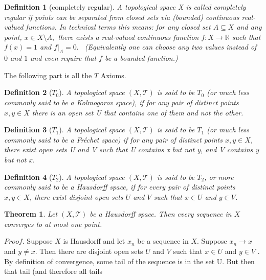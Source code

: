 \documentclass{article}
\newtheorem{definition}{Definition}[section]    %
\newtheorem{theorem}{Theorem}[section]          %
\begin{document}
\begin{definition}[completely regular]
    A topological space
    X is called completely regular if points can be
    separated from closed sets via (bounded) continuous real-valued functions. In technical terms this means: for any closed set
    ${\displaystyle A\subseteq X}$ and any point,
    ${\displaystyle x\in X\setminus A,}$ there
    exists a real-valued continuous function
    ${\displaystyle f:X\to \mathbb {R} }$ such that
    ${\displaystyle f(x)=1}$ and
    ${\displaystyle f\vert _{A}=0.}$ \
    (Equivalently one can choose any two values
    instead of
    ${\displaystyle 0}$ and
    ${\displaystyle 1}$ and even require that
    ${\displaystyle f}$ be a bounded function.)
    \cite[Tychonoff]{Tychonoff}
\end{definition}
The following part is all the $T$ Axioms.
\begin{definition}[$T_0$]
    A topological space $(X, \mathcal{T})$ is said to be $T_0$ (or much less commonly said to
    be a Kolmogorov space), if for any pair of distinct points $x, y \in X$ there is an open set U that
    contains one of them and not the other.
    \cite[script5]{MAT327topology5script}
\end{definition}
\begin{definition}[$T_1$]
    A topological space $(X, \mathcal{T})$ is said to be $T_1$ (or much less commonly said to be
    a Fr\'echet space) if for any pair of distinct points $x, y \in X$, there exist open sets U and V such
    that U contains x but not y, and V contains y but not x.
    \cite[script5]{MAT327topology5script}
\end{definition}
\begin{definition}[$T_2$]
    A topological space $(X, \mathcal{T})$ is said to be $T_2$, or more commonly said to be
    a Hausdorff space, if for every pair of distinct points $x, y \in X$, there exist disjoint open sets $U$
    and $V$ such that $x \in U$ and $y \in V$.
    \cite[script5]{MAT327topology5script}
\end{definition}
\begin{theorem}
    Let $(X, \mathcal{T})$ be a Hausdorff space. Then every sequence in $X$
    converges to at most one point.
    \cite[script5]{MAT327topology5script}
\end{theorem}
$Proof.$ Suppose $X$ is Hausdorff and let ${x_n}$ be a sequence in $X$. Suppose $x_n \to x$ and $y \not= x$.
Then there are disjoint open sets $U$ and $V$ such that $x \in U$ and $y \in V$ . By definition of
convergence, some tail of the sequence is in the set U. But then that tail (and therefore all tails
\end{document}
